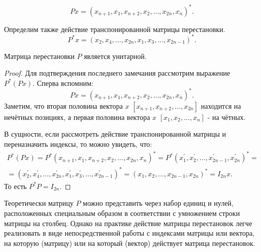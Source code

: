 \begin{equation}
    Px=(x_{n+1},x_1, x_{n+2},x_2,\dots,x_{2n},x_n)^*.
\end{equation}
\begin{note}
    Определим также действие транспонированной матрицы перестановки.
    \begin{equation}
        P^*x=(x_2,x_4,\dots,x_{2n},x_1,x_3,\dots,x_{2n-1})^*.
    \end{equation}
\end{note}

\begin{claim} \label{P-unitary}
    Матрица перестановки \(P\) является унитарной.
\end{claim}
\begin{proof}
    Для подтверждения последнего замечания рассмотрим выражение \(P^*(Px)\). Сперва вспомним: 
    \begin{equation}
        Px=(x_{n+1},x_1, x_{n+2},x_2,\dots,x_{2n},x_n)^*.
    \end{equation}
    Заметим, что вторая половина вектора \(x\) \([x_{n+1},x_{n+2},\dots,x_{2n}]\) находится на нечётных позициях, а первая половина вектора  \(x\) \([x_{1},x_{2},\dots,x_{n}]\) - на чётных. 

    В сущности, если рассмотреть действие транспонированной матрицы и переназначить индексы, то можно увидеть, что:
    \begin{equation*}
        \begin{split}
            P^*(Px)=P^*(x_{n+1},x_1, x_{n+2},x_2,\dots,x_{2n},x_n)^*=P^*(x_{1}^\prime,x_2^\prime,\dots,x_{2n-1}^\prime,x_{2n}^\prime)^*=\\[6pt]=(x_2^\prime,x_4^\prime,\dots,x_{2n}^\prime,x_1^\prime,x_3^\prime,\dots,x_{2n-1}^\prime)^*=(x_{1},x_2,\dots,x_{2n-1},x_{2n})^*=I_{2n}x. 
        \end{split}
    \end{equation*}
    То есть \(P^*P=I_{2n}\).
\end{proof}

\begin{note}
    Теоретически матрицу \(P\) можно представить через набор единиц и нулей, расположенных специальным образом в соответствии с умножением строки матрицы на столбец. Однако на практике действие матрицы перестановок легче реализовать в виде непосредственной работы с индексами матрицы или вектора, на которую (матрицу) или на который (вектор) действует матрица перестановок.   
\end{note}


